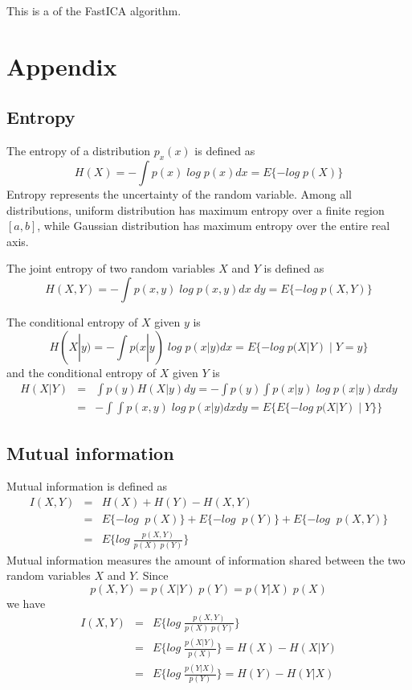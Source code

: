 \documentclass[12pt, a4paper, onecolumn]{IEEEtran}
\begin{document}
This is a 
of the FastICA algorithm.

\section{Appendix}

\subsection*{Entropy}

The entropy of a distribution $p_x(x)$ is defined as
\[	H(X)=-\int p(x)\; log\; p(x) dx=E\{ -log\;p(X) \}	\]
Entropy represents the uncertainty of the random variable. Among all
distributions, uniform distribution has maximum entropy over a finite
region $[a,b]$, while Gaussian distribution has maximum entropy over
the entire real axis.

The joint entropy of two random variables $X$ and $Y$ is defined as
\[ H(X,Y)=-\int p(x,y)\;log\;p(x,y) dx\;dy=E\{-log\;p(X,Y)\} \]

The conditional entropy of $X$ given $y$ is
\[	H(X|y)=-\int p(x|y)\;log\;p(x|y) dx=E\{-log\;p(X|Y) \;|\; Y=y\} \]
and the conditional entropy of $X$ given $Y$ is
\begin{eqnarray}
H(X|Y)&=&\int p(y) H(X|y) dy=-\int p(y) \int p(x|y)\;log\;p(x|y) dx dy
	\nonumber \\
	&=&-\int \int p(x,y)\;log\;p(x|y) dx dy
	=E\{E\{-log\;p(X|Y) \;|\; Y\} \}
	\nonumber
\end{eqnarray}

\subsection*{Mutual information}

Mutual information is defined as
\begin{eqnarray}
I(X,Y)&=&H(X)+H(Y)-H(X,Y)
	\nonumber \\
	&=&E\{ -log\;\;p(X)\}+E\{ -log\;\;p(Y)\}+E\{ -log\;\;p(X,Y)\}
	\nonumber \\
	&=&E\{ log\;\frac{p(X,Y)}{p(X)\;p(Y)} \}
	\nonumber
\end{eqnarray}
Mutual information measures the amount of information shared between the
two random variables $X$ and $Y$. Since
\[	p(X,Y)=p(X|Y) \; p(Y)=p(Y|X) \; p(X)	\]
we have
\begin{eqnarray}
I(X,Y)&=& E\{ log\;\frac{p(X,Y)}{p(X)\;p(Y)} \}
	\nonumber \\
	&=& E\{ log\;\frac{p(X|Y)}{p(X)} \}=H(X)-H(X|Y)
	\nonumber \\
	&=& E\{ log\;\frac{p(Y|X)}{p(Y)} \}=H(Y)-H(Y|X)
	\nonumber
\end{eqnarray}
\end{document}
